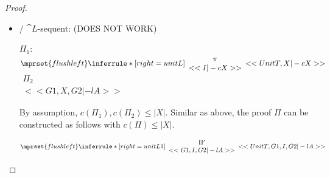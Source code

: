 \begin{proof}
\begin{enumerate}
\begin{itemize}
    \item \ElledruleTXXunitLName / $\cat{L}$-sequent: (DOES NOT WORK)
      \begin{center}
        \scriptsize
        $\Pi_1$:
        \begin{math}
          $$\mprset{flushleft}
          \inferrule* [right={\tiny unitL}] {
            {
              \begin{array}{c}
                \pi \\
                {<<I |-c X>>}
              \end{array}
            }
          }{<<UnitT, X |-c X>>}
        \end{math}
        \qquad\qquad
        \begin{math}
          \begin{array}{c}
            \Pi_2 \\
            {<<G1, X, G2 |-l A>>}
          \end{array}
        \end{math}
      \end{center}
      By assumption, $c(\Pi_1),c(\Pi_2)\leq |X|$. Similar as above, the proof $\Pi$ can be
      constructed as follows with $c(\Pi)\leq |X|$.
      \begin{center}
        \scriptsize
        \begin{math}
          $$\mprset{flushleft}
          \inferrule* [right={\tiny unitL1}] {
            {
              \begin{array}{c}
                \Pi' \\
                {<<G1, I, G2 |-l A>>}
              \end{array}
            }
          }{<<UnitT, G1, I, G2 |-l A>>}
        \end{math}
      \end{center}


\end{itemize}
\end{enumerate}
\end{proof}
